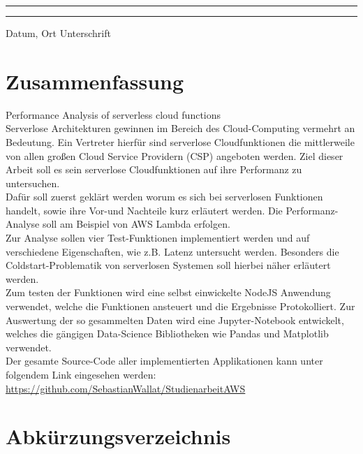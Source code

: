 \documentclass[12pt,a4paper,parskip=half]{scrreprt}
\begin{document}
\vfill
\noindent\rule{5cm}{.4pt}\hfill\rule{5cm}{.4pt}\par
\noindent Datum, Ort \hfill Unterschrift 

\newpage
\thispagestyle{empty}
\chapter*{Zusammenfassung}

 Performance Analysis of serverless cloud functions
\\
Serverlose Architekturen gewinnen im Bereich des Cloud-Computing vermehrt an Bedeutung. Ein Vertreter hierfür sind serverlose Cloudfunktionen die mittlerweile von allen großen Cloud Service Providern (CSP) angeboten werden. Ziel dieser Arbeit soll es sein serverlose Cloudfunktionen auf ihre Performanz zu untersuchen.
\\
Dafür soll zuerst geklärt werden worum es sich bei serverlosen Funktionen handelt, sowie ihre Vor-und Nachteile kurz erläutert werden. Die Performanz-Analyse soll am Beispiel von AWS Lambda erfolgen.
\\
Zur Analyse sollen vier Test-Funktionen implementiert werden und auf verschiedene Eigenschaften, wie z.B. Latenz untersucht werden. Besonders die Coldstart-Problematik von serverlosen Systemen soll hierbei näher erläutert werden.
\\
Zum testen der Funktionen wird eine selbst einwickelte NodeJS Anwendung verwendet, welche die Funktionen ansteuert und die Ergebnisse Protokolliert. Zur Auswertung der so gesammelten Daten wird eine Jupyter-Notebook entwickelt, welches die gängigen Data-Science Bibliotheken wie Pandas und Matplotlib verwendet.
\\
Der gesamte Source-Code aller implementierten Applikationen kann unter folgendem Link eingesehen werden: \url{https://github.com/SebastianWallat/StudienarbeitAWS}


\bigskip


\tableofcontents
{}

\listoffigures
{} 

\newpage
\chapter*{Abkürzungsverzeichnis}
\begin{acronym}[HTTP]
\end{acronym}
\end{document}
